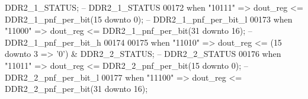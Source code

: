 \begin{DoxyCode}
{      DDR2_1_STATUS};\textcolor{keyword}{                              -- DDR2\_1\_STATUS}
00172                     \textcolor{keywordflow}{when} \textcolor{vhdllogic}{"10111"} \textcolor{vhdlchar}{=}\textcolor{vhdlchar}{>} \textcolor{vhdlchar}{dout_reg} \textcolor{vhdlchar}{<=} \textcolor{vhdlchar}{DDR2_1_pnf_per_bit}\textcolor{vhdlchar}{(}\textcolor{vhdllogic}{}\textcolor{vhdllogic}{15} \textcolor{keywordflow}{downto} \textcolor{vhdllogic}{}\textcolor{vhdllogic}{0}\textcolor{vhdlchar}{)};\textcolor{keyword}{                                    
      -- DDR2\_1\_pnf\_per\_bit\_l}
00173                     \textcolor{keywordflow}{when} \textcolor{vhdllogic}{"11000"} \textcolor{vhdlchar}{=}\textcolor{vhdlchar}{>} \textcolor{vhdlchar}{dout_reg} \textcolor{vhdlchar}{<=} \textcolor{vhdlchar}{DDR2_1_pnf_per_bit}\textcolor{vhdlchar}{(}\textcolor{vhdllogic}{}\textcolor{vhdllogic}{31} \textcolor{keywordflow}{downto} \textcolor{vhdllogic}{}\textcolor{vhdllogic}{16}\textcolor{vhdlchar}{)};\textcolor{keyword}{                               
      -- DDR2\_1\_pnf\_per\_bit\_h}
00174                     
00175                     \textcolor{keywordflow}{when} \textcolor{vhdllogic}{"11010"} \textcolor{vhdlchar}{=}\textcolor{vhdlchar}{>} \textcolor{vhdlchar}{dout_reg} \textcolor{vhdlchar}{<=} \textcolor{vhdlchar}{(}\textcolor{vhdllogic}{}\textcolor{vhdllogic}{15} \textcolor{keywordflow}{downto} \textcolor{vhdllogic}{}\textcolor{vhdllogic}{3} \textcolor{vhdlchar}{=}\textcolor{vhdlchar}{>} \textcolor{vhdlchar}{'}\textcolor{vhdllogic}{}\textcolor{vhdllogic}{0}\textcolor{vhdlchar}{'}\textcolor{vhdlchar}{)} \textcolor{vhdlchar}{&} \textcolor{vhdlchar}{
      DDR2_2_STATUS};\textcolor{keyword}{                          -- DDR2\_2\_STATUS}
00176                     \textcolor{keywordflow}{when} \textcolor{vhdllogic}{"11011"} \textcolor{vhdlchar}{=}\textcolor{vhdlchar}{>} \textcolor{vhdlchar}{dout_reg} \textcolor{vhdlchar}{<=} \textcolor{vhdlchar}{DDR2_2_pnf_per_bit}\textcolor{vhdlchar}{(}\textcolor{vhdllogic}{}\textcolor{vhdllogic}{15} \textcolor{keywordflow}{downto} \textcolor{vhdllogic}{}\textcolor{vhdllogic}{0}\textcolor{vhdlchar}{)};\textcolor{keyword}{                                    
      -- DDR2\_2\_pnf\_per\_bit\_l}
00177                     \textcolor{keywordflow}{when} \textcolor{vhdllogic}{"11100"} \textcolor{vhdlchar}{=}\textcolor{vhdlchar}{>} \textcolor{vhdlchar}{dout_reg} \textcolor{vhdlchar}{<=} \textcolor{vhdlchar}{DDR2_2_pnf_per_bit}\textcolor{vhdlchar}{(}\textcolor{vhdllogic}{}\textcolor{vhdllogic}{31} \textcolor{keywordflow}{downto} \textcolor{vhdllogic}{}\textcolor{vhdllogic}{16}\textcolor{vhdlchar}{)};\textcolor{keyword}{                                   
}
\end{DoxyCode}
